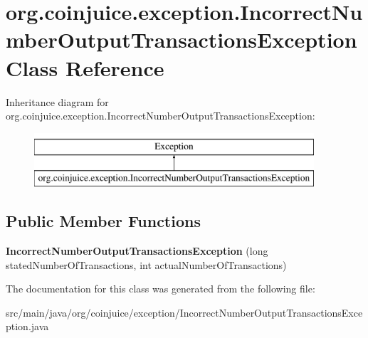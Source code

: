 \hypertarget{classorg_1_1coinjuice_1_1exception_1_1_incorrect_number_output_transactions_exception}{\section{org.\-coinjuice.\-exception.\-Incorrect\-Number\-Output\-Transactions\-Exception Class Reference}
\label{classorg_1_1coinjuice_1_1exception_1_1_incorrect_number_output_transactions_exception}
}
Inheritance diagram for org.\-coinjuice.\-exception.\-Incorrect\-Number\-Output\-Transactions\-Exception\-:\begin{figure}[H]
\begin{center}
\leavevmode
\includegraphics[height=2.000000cm]{classorg_1_1coinjuice_1_1exception_1_1_incorrect_number_output_transactions_exception}
\end{center}
\end{figure}
\subsection*{Public Member Functions}
\begin{DoxyCompactItemize}
\item 
\hypertarget{classorg_1_1coinjuice_1_1exception_1_1_incorrect_number_output_transactions_exception_a26e953925959faa0df57a26098aef3f1}{{\bfseries Incorrect\-Number\-Output\-Transactions\-Exception} (long stated\-Number\-Of\-Transactions, int actual\-Number\-Of\-Transactions)}\label{classorg_1_1coinjuice_1_1exception_1_1_incorrect_number_output_transactions_exception_a26e953925959faa0df57a26098aef3f1}

\end{DoxyCompactItemize}


The documentation for this class was generated from the following file\-:\begin{DoxyCompactItemize}
\item 
src/main/java/org/coinjuice/exception/Incorrect\-Number\-Output\-Transactions\-Exception.\-java\end{DoxyCompactItemize}
